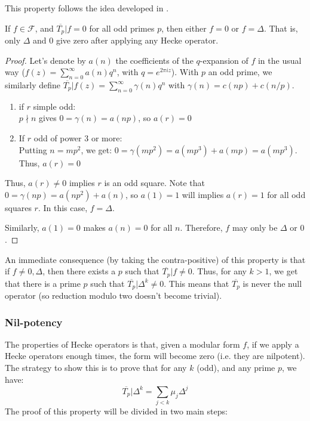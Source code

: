 This property follows the idea developed in \cite[p.33]{TheWebOfModularityArithmeticOfTheCoefficientsOfModularForms}.
\begin{property}
	If $f \in \mathcal{F}$, and $\overline{T_p}|f = 0$ for all odd primes $p$, then either $f = 0$ or $f = \Delta$.
	That is, only $\Delta$ and $0$ give zero after applying any Hecke operator.
\end{property}
\begin{proof}
	Let's denote by $a(n)$ the coefficients of the $q$-expansion of $f$ in the usual way ($f(z) = \sum_{n=0}^{\infty} a(n)q^n$, with $q=e^{2\pi i z}$).
	With $p$ an odd prime, we similarly define $\overline{T_p}|f(z) = \sum_{n=0}^{\infty} \gamma(n)q^n$ with $\gamma(n) = c(np) + c(n/p)$.
	\begin{enumerate}
		\item if $r$ simple odd:\\
		$p \nmid n$ gives $0 = \gamma(n) = a(np)$,
		so $a(r)=0$
		\item If $r$ odd of power 3 or more:\\
		Putting $n=mp^2$, we get: $0 = \gamma(mp^2) = a(mp^3)+a(mp) = a(mp^3)$.\\
		Thus, $a(r)=0$
	\end{enumerate}
	Thus, $a(r) \neq 0$ implies $r$ is an odd square.
	Note that $0 = \gamma(np) = a(np^2) + a(n)$, so $a(1)=1$ will implies $a(r)=1$ for all odd squares $r$.
	In this case, $f = \Delta$.
	
	Similarly, $a(1)=0$ makes $a(n)=0$ for all $n$.
	Therefore, $f$ may only be $\Delta$ or $0$.
\end{proof}

An immediate consequence (by taking the contra-positive) of this property is that if $f \neq 0, \Delta$, then there exists a $p$ such that $\overline{T_p}|f \neq 0$.
Thus, for any $k > 1$, we get that there is a prime $p$ such that $\overline{T_p}|\Delta^k \neq 0$.
This means that $\overline{T_p}$ is never the null operator (so reduction modulo two doesn't become trivial).

\subsubsection{Nil-potency}
\label{NilpotencyHeckeOperators}
The properties of Hecke operators is that, given a modular form $f$, if we apply a Hecke operators enough times, the form will become zero (i.e. they are nilpotent).
The strategy to show this is to prove that for any $k$ (odd), and any prime $p$, we have:
$$
\overline{T_p}| \Delta^k = \sum_{j < k} \mu_j \Delta^j
$$
The proof of this property will be divided in two main steps:

